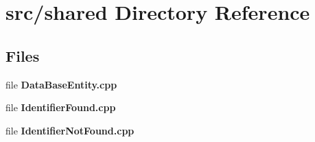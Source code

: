 \section{src/shared Directory Reference}
\label{dir_4f38db07240614f25134cb9a8bebbaf9}
\subsection*{Files}
\begin{DoxyCompactItemize}
\item 
file {\bf Data\+Base\+Entity.\+cpp}
\item 
file {\bf Identifier\+Found.\+cpp}
\item 
file {\bf Identifier\+Not\+Found.\+cpp}
\end{DoxyCompactItemize}
